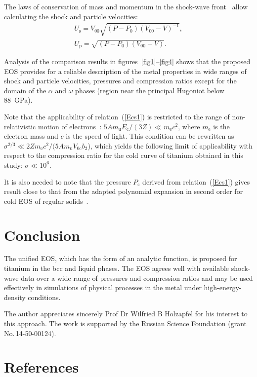 \documentclass[a4paper]{jpconf}
\begin{document}
The laws of conservation of mass and momentum in the shock-wave front~\cite{Zeldovich-Raizer-1967} allow calculating the shock and particle velocities:
\begin{eqnarray}
U_\mathrm{s}=V_{00}\sqrt{(P-P_0)(V_{00}-V)^{-1}},\\
U_\mathrm{p}=\sqrt{(P-P_0)(V_{00}-V)}.
\end{eqnarray}

Analysis of the comparison results in figures~\ref{fig1}--\ref{fig4} shows that the proposed EOS provides for a reliable description of the metal properties in wide ranges of shock and particle velocities, pressures and compression ratios except for the domain of the $\alpha$ and $\omega$ phases (region near the principal Hugoniot below 88~GPa).

Note that the applicability of relation~(\ref{Ecs1}) is restricted to the range of non-relativistic motion of electrons~\cite{Kirzhnits-PhysUsp-1975-eng}: $5Am_\mathrm{u}E_\mathrm{c}/(3Z) \ll m_\mathrm{e}c^2$, where $m_\mathrm{e}$ is the electron mass and $c$ is the speed of light. This condition can be rewritten as $\sigma^{2/3} \ll 2Zm_\mathrm{e}c^2/(5Am_\mathrm{u}V_\mathrm{0c}b_2$), which yields the following limit of applicability with respect to the compression ratio for the cold curve of titanium obtained in this study: $\sigma \ll 10^6$.

It is also needed to note that the pressure $P_\mathrm{c}$ derived from relation~(\ref{Ecs1}) gives result close to that from the adapted polynomial expansion in second order for cold EOS of regular solids~\cite{Holzapfel-EPL-1991, Holzapfel-RPP-1996, Holzapfel-ELBRUS-2010}.

\section{Conclusion}
The unified EOS, which has the form of an analytic function, is proposed for titanium in the bcc and liquid phases. The EOS agrees well with available shock-wave data over a wide range of pressures and compression ratios and may be used effectively in simulations of physical processes in the metal under high-energy-density conditions.

\ack
The author appreciates sincerely Prof Dr Wilfried B Holzapfel for his interest to this approach.
The work is supported by the Russian Science Foundation (grant No.\,14-50-00124).



\section*{References}


\end{document}
